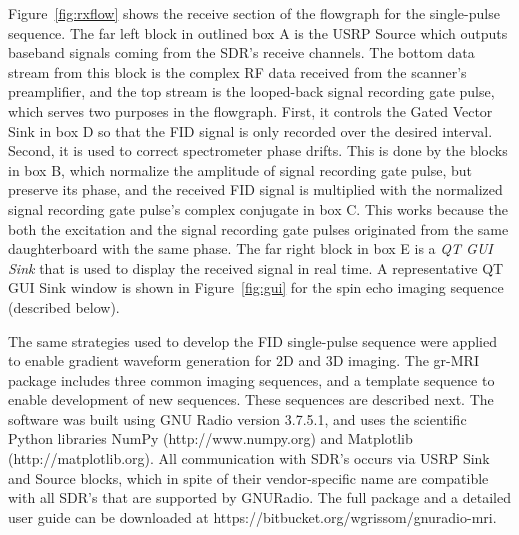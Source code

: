 \documentclass[review]{elsarticle}
\renewcommand{\textcolor}[1]{}
\begin{document}
\par Figure~\ref{fig:rxflow} shows the receive section of the flowgraph for the single-pulse sequence.  
The far left block in outlined box A is the USRP Source which outputs baseband signals
coming from the SDR's receive channels.  
The bottom data stream from this block is the complex RF data received from the scanner's preamplifier, 
and the top stream is the looped-back signal recording gate pulse, which serves two purposes in the flowgraph.
First, it controls the Gated Vector Sink in box D so that the FID signal is only recorded over the desired interval.  
Second, it is used to correct spectrometer phase drifts. 
This is done by the blocks in box B, which normalize the amplitude of signal recording gate pulse, but preserve its phase, and
the received FID signal is multiplied with the normalized signal recording gate pulse's complex conjugate in box C.
This works because the both the excitation and the signal recording gate pulses originated from the same daughterboard with the same phase.
The far right block in box E is a \textit{QT GUI Sink} that is used to display the received signal in real time.  
A representative QT GUI Sink window is shown in Figure~\ref{fig:gui} for the spin echo imaging sequence (described below).

\par The same strategies used to develop the FID single-pulse sequence 
were applied to enable gradient waveform generation for 2D and 3D imaging.
The gr-MRI package includes three common imaging sequences, 
and a template sequence to enable development of new sequences.
These sequences are described next.
The software was built using GNU Radio version 3.7.5.1, 
and uses the scientific Python libraries 
NumPy (http://www.numpy.org) and Matplotlib (http://matplotlib.org).
All communication with SDR's occurs via USRP Sink and Source blocks, 
which in spite of their vendor-specific name are compatible with all SDR's 
that are supported by GNURadio. 
The full package and a detailed user guide can be downloaded at https://bitbucket.org/wgrissom/gnuradio-mri. 
\end{document}
